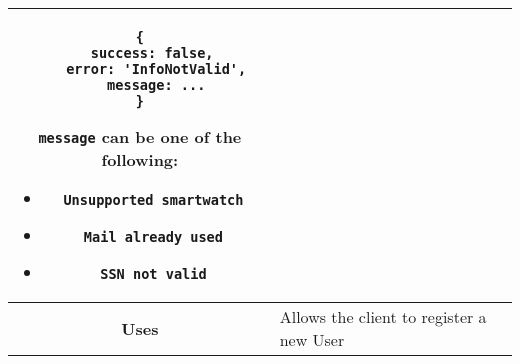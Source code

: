 \begin{adjustwidth}{1cm}{}
\begin{tabular}{|c|l|}
\begin{minipage}[t]{0.7\textwidth}
\begin{adjustwidth}{1.5cm}{}
\begin{verbatim}
{
    success: false, 
    error: 'InfoNotValid',
    message: ...
}
                \end{verbatim}
                \end{adjustwidth}
                \texttt{message} can be one of the following: 
                \begin{itemize}
                    \item \texttt{Unsupported smartwatch}
                    \item \texttt{Mail already used}
                    \item \texttt{SSN not valid}
                \end{itemize}
              \end{minipage} \\
              \hline
            \textbf{Uses} & Allows the client to register a new User \\
            \hline
        \end{tabular}
    \end{adjustwidth}

